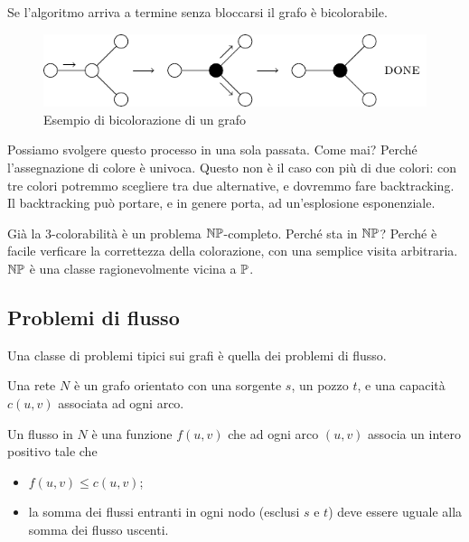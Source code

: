 Se l'algoritmo arriva a termine senza bloccarsi il grafo è bicolorabile.

\begin{figure}[h]
    \begin{center}
        \includegraphics{img/2Coloration.pdf}
    \end{center}
    \caption{Esempio di bicolorazione di un grafo}
\end{figure}

Possiamo svolgere questo processo in una sola passata. Come mai? Perché l'assegnazione di colore è
univoca. Questo non è il caso con più di due colori: con tre colori potremmo scegliere tra due
alternative, e dovremmo fare backtracking. Il backtracking può portare, e in genere porta, ad
un'esplosione esponenziale.

Già la 3-colorabilità è un problema $\mathbb{NP}$-completo. Perché sta in $\mathbb{NP}$? Perché è
facile verficare la correttezza della colorazione, con una semplice visita arbitraria. $\mathbb{NP}$ è
una classe ragionevolmente vicina a $\mathbb{P}$.

\subsection{Problemi di flusso}

Una classe di problemi tipici sui grafi è quella dei problemi di flusso.

\begin{defn}
    Una rete $N$ è un grafo orientato con una sorgente $s$, un pozzo $t$, e una capacità $c(u,v)$
    associata ad ogni arco.
\end{defn}

\begin{defn}
    Un flusso in $N$ è una funzione $f(u,v)$ che ad ogni arco $(u,v)$ associa un intero positivo
    tale che
    \begin{itemize}
        \item $f(u,v) \leq c(u,v)$;
        \item la somma dei flussi entranti in ogni nodo (esclusi $s$ e $t$) deve essere uguale alla
        somma dei flusso uscenti.
    \end{itemize}
\end{defn}

